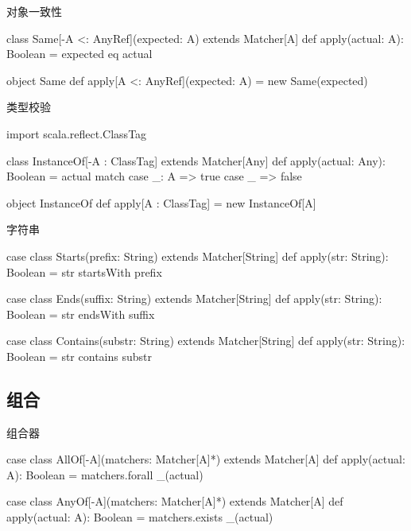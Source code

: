 \begin{frame}[fragile]{对象一致性}
  \begin{scala}
class Same[-A <: AnyRef](expected: A) extends Matcher[A] {
  def apply(actual: A): Boolean = expected eq actual
}

object Same {
  def apply[A <: AnyRef](expected: A) = new Same(expected)
}
  \end{scala}
\end{frame}

\begin{frame}[fragile]{类型校验}
  \begin{scala}
import scala.reflect.ClassTag

class InstanceOf[-A : ClassTag] extends Matcher[Any] {
  def apply(actual: Any): Boolean = actual match {
    case _: A => true
    case _    => false
  }
}

object InstanceOf {
  def apply[A : ClassTag] = new InstanceOf[A]
}
  \end{scala}
\end{frame}

\begin{frame}[fragile]{字符串}
  \begin{scala}
case class Starts(prefix: String) extends Matcher[String] {
  def apply(str: String): Boolean = str startsWith prefix
}

case class Ends(suffix: String) extends Matcher[String] {
  def apply(str: String): Boolean = str endsWith suffix
}

case class Contains(substr: String) extends Matcher[String] {
  def apply(str: String): Boolean = str contains substr
}
  \end{scala}
\end{frame}

\subsection{组合}

\begin{frame}[fragile]{组合器}
  \begin{scala}
case class AllOf[-A](matchers: Matcher[A]*) extends Matcher[A] {
  def apply(actual: A): Boolean = matchers.forall { _(actual) }
}

case class AnyOf[-A](matchers: Matcher[A]*) extends Matcher[A] {
  def apply(actual: A): Boolean = matchers.exists { _(actual) }
}
  \end{scala}
\end{frame}

